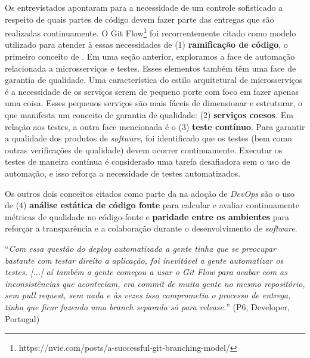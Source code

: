Os entrevistados apontaram para a necessidade de um controle sofisticado a
respeito de quais partes de código devem fazer parte das entregas que são
realizadas continuamente. O Git Flow\footnote{https://nvie.com/posts/a-successful-git-branching-model/}
foi recorrentemente citado como modelo utilizado para atender à essas necessidades
de (1) {\bf ramificação de código}, o primeiro conceito de . Em uma seção anterior, exploramos a face de automação relacionada
a microsserviços e testes. Esses elementos também têm uma face de garantia de
qualidade. Uma característica do estilo arquitetural de microsserviços é a
necessidade de os serviços serem de pequeno porte com foco em fazer apenas uma coisa.
Esses pequenos serviços são mais fáceis de dimensionar e estruturar, o que
manifesta um conceito de garantia de qualidade: (2) {\bf serviços coesos}. Em
relação aos testes, a outra face mencionada é o (3) \textbf{teste contínuo}.
Para garantir a qualidade dos produtos de {\it software}, foi identificado que
os testes (bem como outras verificações de qualidade) devem ocorrer
continuamente. Executar os testes de maneira contínua é considerado uma tarefa
desafiadora sem o uso de automação, e isso reforça a necessidade de testes
automatizados.

Os outros dois conceitos citados como parte da  na
adoção de {\it DevOps} são o uso de (4) \textbf{análise estática de código
fonte} para calcular e avaliar continuamente métricas de qualidade no
código-fonte e \textbf{paridade entre os ambientes} para reforçar a
transparência e a colaboração durante o desenvolvimento de {\it software}.

\begin{mq}
``\emph{Com essa questão do deploy automatizado a gente tinha que se preocupar
bastante com testar direito a aplicação, foi inevitável a gente automatizar os
testes. [...] aí também a gente começou a usar o Git Flow para acabar com as
inconsistências que aconteciam, era commit de muita gente no mesmo repositório,
sem pull request, sem nada e às vezes isso comprometia o processo de entrega,
tinha que ficar fazendo uma branch separada só para release.}''
(P6, Developer, Portugal)
\end{mq}

